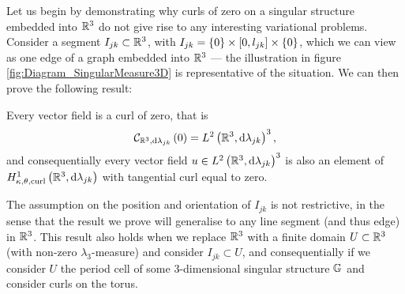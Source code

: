 Let us begin by demonstrating why curls of zero on a singular structure embedded into $\mathbb{R}^3$ do not give rise to any interesting variational problems.
Consider a segment $I_{jk}\subset\mathbb{R}^3$, with $I_{jk} = \left\{ 0 \right\}\times\left[ 0,l_{jk} \right]\times\left\{ 0 \right\}$, which we can view as one edge of a graph embedded into $\mathbb{R}^3$ --- the illustration in figure \ref{fig:Diagram_SingularMeasure3D} is representative of the situation.
We can then prove the following result:
\begin{prop} \label{prop:3DGraph-CurlsAreZero}
	Every vector field is a curl of zero, that is
	\begin{align*}
		\mathcal{C}_{ \mathbb{R}^3, \mathrm{d}\lambda_{jk}}\left( 0 \right) = L^{2}\left( \mathbb{R}^3,\mathrm{d} \lambda_{jk} \right)^3,
	\end{align*}
	and consequentially every vector field $u\in L^{2}\left( \mathbb{R}^3,\mathrm{d} \lambda_{jk} \right)^3$ is also an element of $H^1_{\kappa,\theta,\mathrm{curl}}\left( \mathbb{R}^3, \mathrm{d}\lambda_{jk} \right)$ with tangential curl equal to zero.
\end{prop}
The assumption on the position and orientation of $I_{jk}$ is not restrictive, in the sense that the result we prove will generalise to any line segment (and thus edge) in $\mathbb{R}^3$.
This result also holds when we replace $\mathbb{R}^3$ with a finite domain $U\subset\mathbb{R}^3$ (with non-zero $\lambda_3$-measure) and consider $I_{jk}\subset U$, and consequentially if we consider $U$ the period cell of some 3-dimensional singular structure $\mathbb{G}$ and consider curls on the torus.
